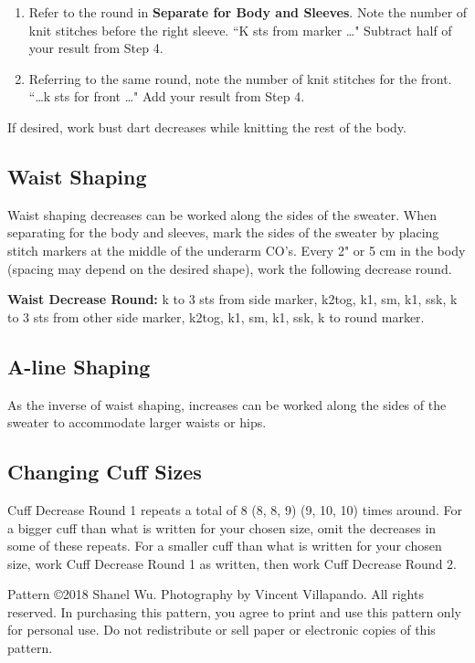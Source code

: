 \documentclass[12pt]{article}
\newcommand{\rowDir}[1]{\textbf{#1:}} %
\newcommand{\blank}{\underline{\hspace{2em}} } %
\newenvironment{frnote}
    {%
    	\setlength{\FrameRule}{1.5pt}
    	\def\FrameCommand{\fboxrule=\FrameRule\fboxsep=\FrameSep \fcolorbox{framecolor}{shadecolor}}
    	\MakeFramed {\FrameRestore}}
    {\setlength{\FrameRule}{1pt}
	\endMakeFramed}
\begin{document}
\begin{multicols}{2}
\begin{enumerate}
\item Refer to the round in \textbf{Separate for Body and Sleeves}. Note the number of knit stitches before the right sleeve. ``K \blank sts from marker \ldots" Subtract half of your result from Step 4. \blank

\item Referring to the same round, note the number of knit stitches for the front. ``\ldots k \blank sts for front \ldots" Add your result from Step 4. \blank
\end{enumerate}

If desired, work bust dart decreases while knitting the rest of the body.

\subsection*{Waist Shaping}
Waist shaping decreases can be worked along the sides of the sweater. When separating for the body and sleeves, mark the sides of the sweater by placing stitch markers at the middle of the underarm CO's. Every 2" or 5 cm in the body (spacing may depend on the desired shape), work the following decrease round.

\rowDir{Waist Decrease Round} k to 3 sts from side marker, k2tog, k1, sm, k1, ssk, k to 3 sts from other side marker, k2tog, k1, sm, k1, ssk, k to round marker.

\subsection*{A-line Shaping}
As the inverse of waist shaping, increases can be worked along the sides of the sweater to accommodate larger waists or hips.

\subsection*{Changing Cuff Sizes}
Cuff Decrease Round 1 repeats a total of 8 (8, 8, 9) (9, 10, 10) times around. For a bigger cuff than what is written for your chosen size, omit the decreases in some of these repeats. For a smaller cuff than what is written for your chosen size, work Cuff Decrease Round 1 as written, then work Cuff Decrease Round 2.

\end{multicols}

\vfill
\begin{frnote} \ssmall
Pattern \copyright 2018 Shanel Wu. Photography by Vincent Villapando. All rights reserved. In purchasing this pattern, you agree to print and use this pattern only for personal use. Do not redistribute or sell paper or electronic copies of this pattern.
\end{frnote}
\end{document}
